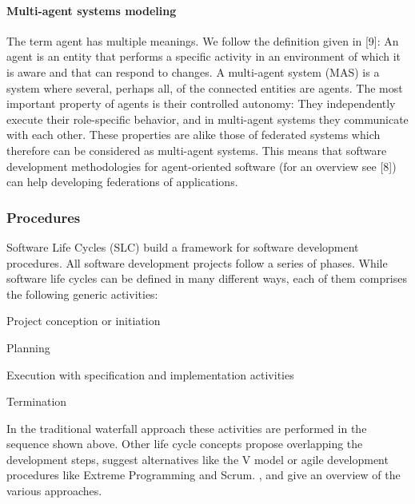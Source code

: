 \paragraph{Multi-agent systems modeling}
The term agent has multiple meanings. We follow the definition given in [9]: An agent is an entity that performs a specific activity in an environment of which it is aware and that can respond to changes. A multi-agent system (MAS) is a system where several, perhaps all, of the connected entities are agents. The most important property of agents is their controlled autonomy: They independently execute their role-specific behavior, and in multi-agent systems they communicate with each other. These properties are alike those of federated systems which therefore can be considered as multi-agent systems. This means that software development methodologies for agent-oriented software (for an overview see [8]) can help developing federations of applications.
\\
\subsubsection{\textbf{Procedures}}
Software Life Cycles (SLC) build a framework for software development procedures. All software development projects follow a series of phases. While software life cycles can be defined in many different ways, each of them comprises the following generic activities:
\begin{list}{-}{spacing}
	\item Project conception or initiation
	\item Planning
	\item Execution with specification and implementation activities
	\item Termination
\end{list}

In the traditional waterfall approach these activities are performed in the sequence shown above. Other life cycle concepts propose overlapping the development steps, suggest alternatives like the V model or agile development procedures like Extreme Programming and Scrum. \cite{article:ObjectOrientedSWdev}, \cite{book:SoftEng} and \cite{book:ISDevelopment} give an overview of the various approaches.
\\
